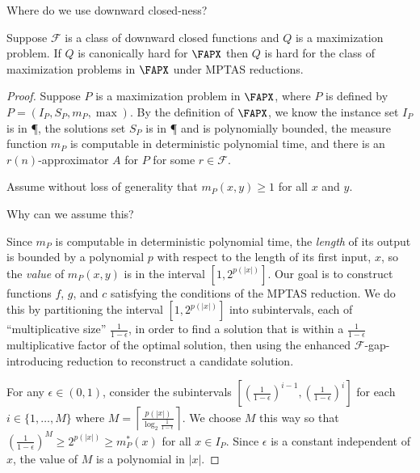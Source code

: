 \documentclass{article}
\newcommand{\ceil}[1]{\left\lceil#1\right\rceil}
\begin{document}
\begin{todo}
  Where do we use downward closed-ness?
\end{todo}
\begin{theorem}\label{thm:hardness}
  Suppose $\mathcal{F}$ is a class of downward closed functions and $Q$ is a maximization problem.
  If $Q$ is canonically hard for $\FAPX$ then $Q$ is hard for the class of maximization problems in $\FAPX$ under MPTAS reductions.
\end{theorem}
\begin{proof}
  Suppose $P$ is a maximization problem in $\FAPX$, where $P$ is defined by $P = (I_P, S_P, m_P, \max)$.
  By the definition of $\FAPX$, we know the instance set $I_P$ is in \P, the solutions set $S_P$ is in \P{} and is polynomially bounded, the measure function $m_P$ is computable in deterministic polynomial time, and there is an $r(n)$-approximator $A$ for $P$ for some $r \in \mathcal{F}$.

  Assume without loss of generality that $m_P(x, y) \geq 1$ for all $x$ and $y$.
  \begin{todo}
    Why can we assume this?
  \end{todo}
  Since $m_P$ is computable in deterministic polynomial time, the \emph{length} of its output is bounded by a polynomial $p$ with respect to the length of its first input, $x$, so the \emph{value} of $m_P(x, y)$ is in the interval $[1, 2^{p(|x|)}]$.
  Our goal is to construct functions $f$, $g$, and $c$ satisfying the conditions of the MPTAS reduction.
  We do this by partitioning the interval $[1, 2^{p(|x|)}]$ into subintervals, each of ``multiplicative size'' $\frac{1}{1 - \epsilon}$, in order to find a solution that is within a $\frac{1}{1 - \epsilon}$ multiplicative factor of the optimal solution, then using the enhanced $\mathcal{F}$-gap-introducing reduction to reconstruct a candidate solution.

  For any $\epsilon \in (0, 1)$, consider the subintervals $\left[\left(\frac{1}{1 - \epsilon}\right)^{i - 1}, \left(\frac{1}{1 - \epsilon}\right)^i\right]$ for each $i \in \{1, \dotsc, M\}$ where $M = \ceil{\frac{p(|x|)}{\log_2{\frac{1}{1 - \epsilon}}}}$.
  We choose $M$ this way so that $\left(\frac{1}{1 - \epsilon}\right)^M \geq 2^{p(|x|)} \geq m_P^*(x)$ for all $x \in I_P$.
  Since $\epsilon$ is a constant independent of $x$, the value of $M$ is a polynomial in $|x|$.


\end{proof}
\end{document}
